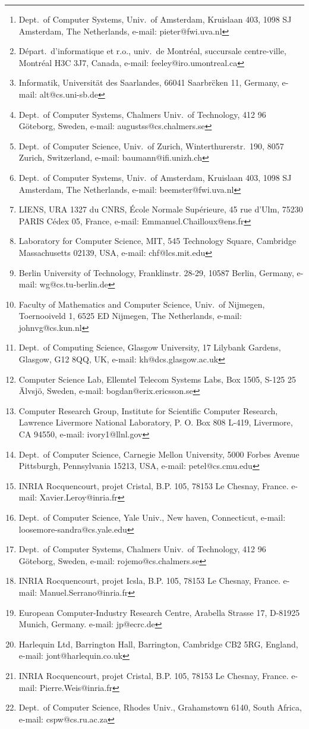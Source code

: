 \author{
Pieter H. Hartel \thanks{Dept.\ of Computer Systems, Univ.\ of
Amsterdam, Kruislaan 403, 1098 SJ Amsterdam, The Netherlands, e-mail:
pieter@fwi.uva.nl} \and
Marc Feeley \thanks{D\'epart.\ d'informatique et r.o., univ.\ de
Montr\'eal, succursale centre-ville, Montr\'eal H3C 3J7, Canada,
e-mail: feeley@iro.umontreal.ca} \and
Martin Alt \thanks{Informatik, Universit\"at des Saarlandes,
66041 Saarbr\"cken 11, Germany, e-mail: alt@cs.uni-sb.de} \and
Lennart Augustsson \thanks{Dept.\ of Computer Systems, Chalmers Univ.\ of
Technology, 412 96 G\"oteborg, Sweden, e-mail: augustss@cs.chalmers.se} \and
Peter Baumann \thanks{Dept.\ of Computer Science, Univ.\ of Zurich,
Winterthurerstr.\ 190, 8057 Zurich, Switzerland, e-mail:
baumann@ifi.unizh.ch} \and
Marcel Beemster \thanks{Dept.\ of Computer Systems, Univ.\ of
Amsterdam, Kruislaan 403, 1098 SJ Amsterdam, The Netherlands, e-mail:
beemster@fwi.uva.nl} \and
Emmanuel Chailloux \thanks{LIENS, URA 1327 du CNRS, \'Ecole Normale
Sup\'erieure, 45 rue d'Ulm, 75230 PARIS C\'edex 05, France, e-mail:
Emmanuel.Chailloux@ens.fr} \and
Christine H. Flood \thanks{Laboratory for Computer Science, MIT, 545
Technology Square, Cambridge Massachusetts 02139, USA, e-mail:
chf@lcs.mit.edu} \and
Wolfgang Grieskamp \thanks{Berlin University of Technology,
Franklinstr. 28-29, 10587 Berlin, Germany, e-mail: wg@cs.tu-berlin.de} \and
John H. G.\ van Groningen \thanks{Faculty of Mathematics and Computer
Science, Univ.\ of Nijmegen, Toernooiveld 1, 6525 ED Nijmegen, The
Netherlands, e-mail: johnvg@cs.kun.nl} \and
Kevin Hammond \thanks{Dept.\ of Computing Science, Glasgow University,
17 Lilybank Gardens, Glasgow, G12 8QQ, UK, e-mail: kh@dcs.glasgow.ac.uk} \and
Bogumi\l~Hausman \thanks{Computer Science Lab, Ellemtel Telecom Systems
Labs, Box 1505, S-125 25 \"Alvsj\"o, Sweden, e-mail:
bogdan@erix.ericsson.se} \and
Melody Y. Ivory \thanks{Computer Research Group, Institute for
Scientific Computer Research, Lawrence Livermore National Laboratory,
P. O. Box 808 L-419, Livermore, CA 94550, e-mail: ivory1@llnl.gov} \and
Peter Lee\thanks{Dept.\ of Computer Science, Carnegie Mellon University,
5000 Forbes Avenue Pittsburgh, Pennsylvania 15213, USA, e-mail:
petel@cs.cmu.edu} \and
Xavier Leroy \thanks{INRIA Rocquencourt, projet Cristal,
B.P. 105, 78153 Le Chesnay, France. e-mail: Xavier.Leroy@inria.fr} \and
Sandra Loosemore \thanks{Dept.\ of Computer Science, Yale Univ., New haven,
Connecticut, e-mail: loosemore-sandra@cs.yale.edu} \and
Niklas R\"ojemo \thanks{Dept.\ of Computer Systems, Chalmers Univ.\ of
Technology, 412 96 G\"oteborg, Sweden, e-mail: rojemo@cs.chalmers.se} \and
Manuel Serrano \thanks{INRIA Rocquencourt, projet Icsla,
B.P. 105, 78153 Le Chesnay, France. e-mail: Manuel.Serrano@inria.fr} \and
Jean-Pierre Talpin \thanks{European Computer-Industry Research Centre, 
Arabella Strasse 17, D-81925 Munich, Germany. e-mail: jp@ecrc.de} \and
Jon Thackray \thanks{Harlequin Ltd, Barrington Hall, Barrington,
Cambridge CB2 5RG, England, e-mail: jont@harlequin.co.uk} \and
Pierre Weis \thanks{INRIA Rocquencourt, projet Cristal,
B.P. 105, 78153 Le Chesnay, France. e-mail: Pierre.Weis@inria.fr} \and
Peter Wentworth \thanks{Dept.\ of Computer Science, Rhodes Univ.,
Grahamstown 6140, South Africa, e-mail: cspw@cs.ru.ac.za}
}

